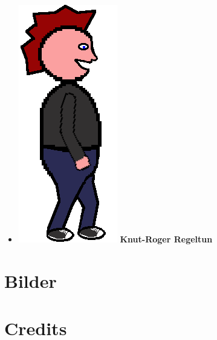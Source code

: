 \documentclass[paper=a4]{article}
\begin{document}
{\begin{itemize}
	\item \includegraphics[scale = 0.3]{images/rockboy.png} \textbf{Knut-Roger Regeltun}
\end{itemize}
}

\section{Bilder}

\newpage
\section{Credits}
\end{document}
